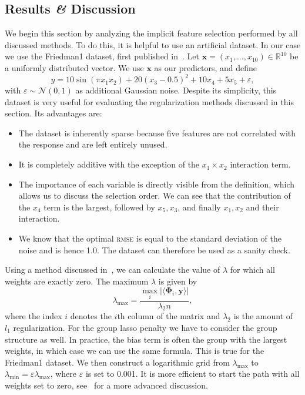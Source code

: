 \FloatBarrier{}
\subsection{Results \textit{\&} Discussion}
We begin this section by analyzing the implicit feature selection performed by
all discussed methods.
To do this, it is helpful to use an artificial dataset.
In our case we use the Friedman1 dataset, first published in~\cite{datasets-friedman}.
Let \(\bm{x} = (x_1, \ldots, x_{10}) \in \mathbb{R}^{10}\) be a uniformly distributed vector.
We use \(\bm{x}\) as our predictors, and define
\begin{equation}\label{eq:friedman1}
  y = 10 \sin(\pi x_1 x_2) + 20(x_3 - 0.5)^2 + 10x_4 + 5x_5 + \varepsilon,
\end{equation}
with \(\varepsilon \sim \mathcal{N}(0,1)\) as additional Gaussian noise.
Despite its simplicity, this dataset is very useful for evaluating the
regularization methods discussed in this section.
Its advantages are:
\begin{itemize}
\item The dataset is inherently sparse because five features are not correlated with the
  response and are left entirely unused.
\item It is completely additive with the exception of the \(x_1 \times x_2\)
  interaction term.
\item The importance of each variable is directly visible from the definition,
  which allows us to discuss the selection order.
  We can see that the contribution of the \(x_4\) term is the largest, followed
  by \(x_5, x_3\), and finally \(x_1, x_2\) and their interaction.
\item We know that the optimal \textsc{rmse} is equal to the standard deviation
  of the noise and is hence 1.0.
  The dataset can therefore be used as a sanity check.
\end{itemize}

Using a method discussed in~\cite{regularizationpaths}, we can calculate the value of \(\lambda\) for which all weights are exactly zero.
The maximum \(\lambda\) is given by
\begin{equation*}
  \lambda_{\text{max}} = \frac{\max_i \vert \langle \bm{\Phi}_i, \bm{y} \rangle \vert}{\lambda_2 n},
\end{equation*}
where the index \(i\) denotes the \(i\)th column of the matrix and \(\lambda_2\) is the amount of \(l_1\) regularization.
For the group lasso penalty we have to consider the group structure as well.
In practice, the bias term is often the group with the largest weights, in which
case we can use the same formula.
This is true for the Friedman1 dataset.
We then construct a logarithmic grid from \(\lambda_{\text{max}}\) to \(\lambda_{\text{min}} = \varepsilon \lambda_{\text{max}}\), where \(\varepsilon\) is set to 0.001.
It is more efficient to start the path with all weights set to zero,
see~\cite{regularizationpaths} for a more advanced discussion.

